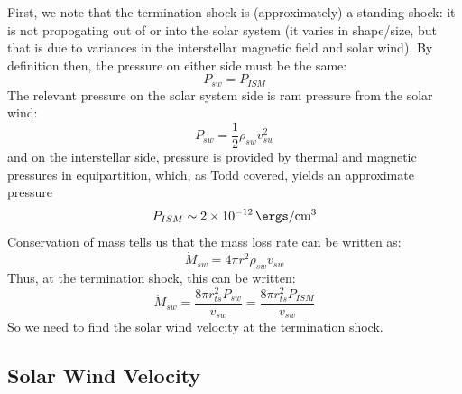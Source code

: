 \documentclass{article}
\begin{document}
		First, we note that the termination shock is (approximately) a standing shock: it is not propogating out of or into the solar system (it varies in shape/size, but that is due to variances in the interstellar magnetic field and solar wind).  By definition then, the pressure on either side must be the same:
		\begin{equation}
			P_{sw} = P_{ISM}
		\end{equation}
		The relevant pressure on the solar system side is ram pressure from the solar wind:
		\begin{equation}
			P_{sw} = \frac{1}{2}\rho_{sw}v_{sw}^{2}
		\end{equation}
		and on the interstellar side, pressure is provided by thermal and magnetic pressures in equipartition, which, as Todd covered, yields an approximate pressure
		\begin{equation}
			P_{ISM} \sim \SI{2e-12}{\ergs\per\cm\cubed}
		\end{equation}
		Conservation of mass tells us that the mass loss rate can be written as:
		\begin{equation}
			\dot{M}_{sw} = 4\pi r^{2}\rho_{sw}v_{sw}
		\end{equation}
		Thus, at the termination shock, this can be written:
		\begin{equation}
			\dot{M}_{sw} = \frac{8\pi r_{ts}^{2}P_{sw}}{v_{sw}} = \frac{8\pi r_{ts}^{2}P_{ISM}}{v_{sw}}
		\end{equation}
		So we need to find the solar wind velocity at the termination shock.
		
		\subsection{Solar Wind Velocity}
		
\end{document}
